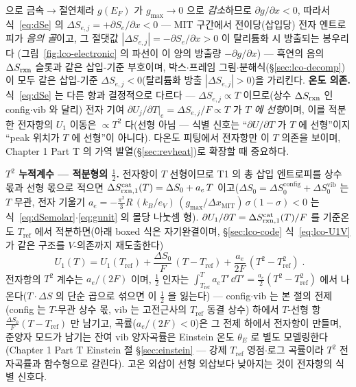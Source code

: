 으로 금속$\to$절연체라 $g(E_F)$ 가 $g_{\max}\!\to\!0$ 으로 \emph{감소}하므로 $\partial g/\partial x<0$, 따라서
식~\eqref{eq:dSe} 의 $\Delta S_{e,j}=+\partial S_e/\partial x<0$ --- MIT 구간에서 전이당(삽입당) 전자 엔트로피가
\emph{음의 골}이고, 그 절댓값 $|\Delta S_{e,j}|=-\partial S_e/\partial x>0$ 이 탈리튬화 시 방출되는 봉우리다
(그림~\ref{fig:lco-electronic} 의 파선이 이 양의 방출량 $-\partial g/\partial x$) --- 흑연의 음의 $\Delta S_{\mathrm{rxn}}$
슬롯과 같은 삽입-기준 부호이며, 박스$\cdot$프레임 그림$\cdot$분해식(\S\ref{sec:lco-decomp})이 모두 같은
삽입-기준 $\Delta S_{e,j}<0$(탈리튬화 방출 $|\Delta S_{e,j}|>0$)을 가리킨다. \textbf{온도 의존.} 식~\eqref{eq:dSe} 는 다른 항과 결정적으로 다르다 --- $\Delta S_{e,j}\propto T$ 이므로(상수 $\Delta S_{\mathrm{rxn}}$ 인
config$\cdot$vib 와 달리) 전자 기여 $\partial U_j/\partial T|_e=\Delta S_{e,j}/F\propto T$ 가 \emph{$T$ 에 선형}이며,
이를 적분한 전자항의 $U_1$ 이동은 $\propto T^2$ 다(선형 아님 --- 식별 신호는 ``$\partial U/\partial T$ 가 $T$ 에
선형''이지 ``peak 위치가 $T$ 에 선형''이 아니다). 다온도 피팅에서 전자항만 이 $T$ 의존을 보이며, Chapter 1 Part T 의 가역 발열(\S\ref{sec:revheat})로 확장할 때 중요하다.

\textbf{$T^2$ 누적계수 --- 적분형의 $\tfrac12$.} 전자항이 $T$ 선형이므로 T1 의 총 삽입 엔트로피를 상수 몫과 선형 몫으로 적으면
$\Delta S_{\mathrm{rxn},1}^\mathrm{cat}(T)=\Delta S_0+a_e\,T$ 이고($\Delta S_0=\Delta S_0^\mathrm{config}+
\Delta S_0^\mathrm{vib}$ 는 $T$ 무관, 전자 기울기 $a_e=-\tfrac{\pi^2}{3}R\,(k_B/e_V)\,(g_{\max}/
\Delta x_\mathrm{MIT})\,\sigma(1-\sigma)<0$ 는 식~\eqref{eq:dSemolar}$\cdot$\eqref{eq:gunit} 의 몰당 나눗셈 형).
$\partial U_1/\partial T=\Delta S_{\mathrm{rxn},1}^\mathrm{cat}(T)/F$ 를 기준온도 $T_\mathrm{ref}$ 에서 적분하면(아래 boxed 식은 자기완결이며, \S\ref{sec:lco-code} 식~\eqref{eq:lco-U1V} 가 같은 구조를 $V$-의존까지 재도출한다)
\begin{equation}
\boxed{\;U_1(T)=U_1(T_\mathrm{ref})+\frac{\Delta S_0}{F}\,(T-T_\mathrm{ref})+\frac{a_e}{2F}\,(T^2-T_\mathrm{ref}^2)\;.}
\label{eq:U1T2}
\end{equation}
전자항의 $T^2$ 계수는 $a_e/(2F)$ 이며, $\tfrac12$ 인자는 $\int_{T_\mathrm{ref}}^{T}a_e T'\,\dd T'=\tfrac{a_e}{2}
(T^2-T_\mathrm{ref}^2)$ 에서 나온다($T\cdot\Delta S$ 의 단순 곱으로 섞으면 이 $\tfrac12$ 을 잃는다) --- config$\cdot$vib 는
본 절의 전제(config 는 $T$-무관 상수 몫, vib 는 고전근사의 $T_\mathrm{ref}$ 동결 상수) 하에서
$T$-선형 항 $\tfrac{\Delta S_0}{F}(T-T_\mathrm{ref})$ 만 남기고, 곡률($a_e/(2F)<0$)은 그 전제 하에서
전자항이 만들며, 준양자 모드가 남기는 잔여 vib 양자곡률은 Einstein 온도 $\theta_E$ 로 별도
모델링한다(Chapter 1 Part T Einstein 절 \S\ref{sec:einstein} --- 강제 $T_\mathrm{ref}$ 영점$\cdot$로그 곡률이라 $T^2$ 전자곡률과 함수형으로
갈린다). 고온 외삽이 선형 외삽보다 낮아지는 것이 전자항의 식별 신호다.

